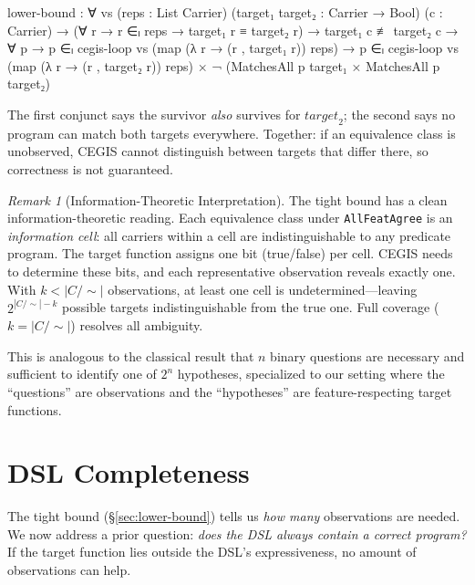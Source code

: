 \documentclass[9pt,a4paper]{article}
\theoremstyle{plain}
\theoremstyle{definition}
\theoremstyle{remark}
\newtheorem{remark}{Remark}
\begin{document}
\begin{spec}
    lower-bound : ∀ vs (reps : List Carrier)
      (target₁ target₂ : Carrier → Bool) (c : Carrier) →
      (∀ r → r ∈ₗ reps → target₁ r ≡ target₂ r) →
      target₁ c ≢ target₂ c →
      ∀ p → p ∈ₗ cegis-loop vs (map (λ r → (r , target₁ r)) reps) →
      p ∈ₗ cegis-loop vs (map (λ r → (r , target₂ r)) reps)
        × ¬ (MatchesAll p target₁ × MatchesAll p target₂)
\end{spec}

\noindent The first conjunct says the survivor \emph{also} survives for $\mathit{target}_2$; the second says no program can match both targets everywhere.
Together: if an equivalence class is unobserved, CEGIS cannot distinguish between targets that differ there, so correctness is not guaranteed.

\begin{remark}[Information-Theoretic Interpretation]
The tight bound has a clean information-theoretic reading.
Each equivalence class under \texttt{AllFeatAgree} is an \emph{information cell}: all carriers within a cell are indistinguishable to any predicate program.
The target function assigns one bit (true/false) per cell.
CEGIS needs to determine these bits, and each representative observation reveals exactly one.
With $k < |C/{\sim}|$ observations, at least one cell is undetermined---leaving $2^{|C/{\sim}| - k}$ possible targets indistinguishable from the true one.
Full coverage ($k = |C/{\sim}|$) resolves all ambiguity.

This is analogous to the classical result that $n$ binary questions are necessary and sufficient to identify one of $2^n$ hypotheses, specialized to our setting where the ``questions'' are observations and the ``hypotheses'' are feature-respecting target functions.
\end{remark}



\section{DSL Completeness}
\label{sec:dsl-complete}

The tight bound (\S\ref{sec:lower-bound}) tells us \emph{how many} observations are needed.
We now address a prior question: \emph{does the DSL always contain a correct program?}
If the target function lies outside the DSL's expressiveness, no amount of observations can help.
\end{document}
